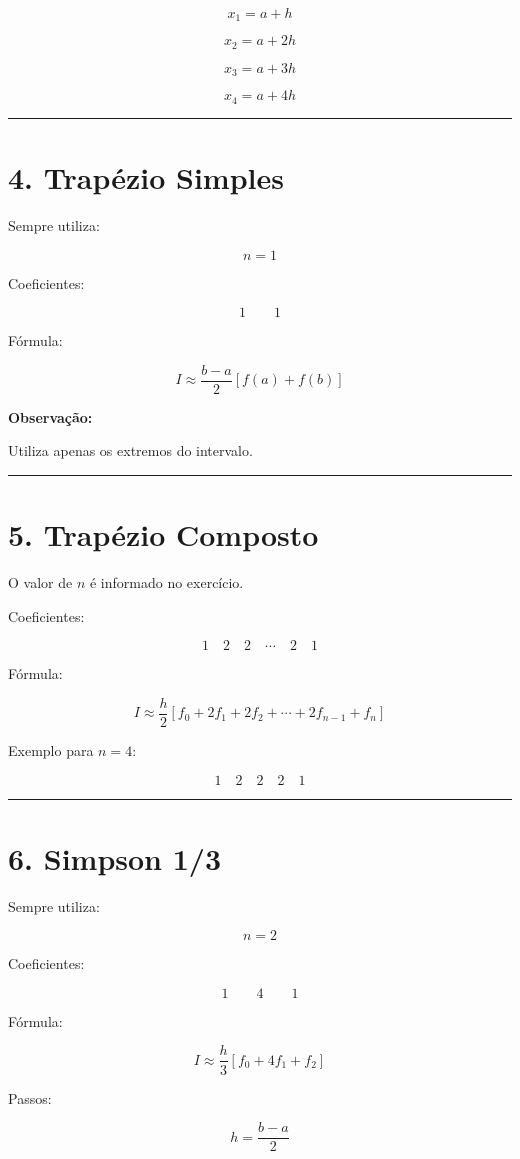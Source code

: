 \documentclass[12pt,a4paper]{article}
\begin{document}
\[
x_1=a+h
\]

\[
x_2=a+2h
\]

\[
x_3=a+3h
\]

\[
x_4=a+4h
\]

\hrule

\section*{4. Trapézio Simples}

Sempre utiliza:

\[
n=1
\]

Coeficientes:

\[
1 \qquad 1
\]

Fórmula:

\[
I
\approx
\frac{b-a}{2}
\left[f(a)+f(b)\right]
\]

\textbf{Observação:}

Utiliza apenas os extremos do intervalo.

\hrule

\section*{5. Trapézio Composto}

O valor de \(n\) é informado no exercício.

Coeficientes:

\[
1 \quad 2 \quad 2 \quad \cdots \quad 2 \quad 1
\]

Fórmula:

\[
I
\approx
\frac{h}{2}
\left[
f_0
+
2f_1
+
2f_2
+
\cdots
+
2f_{n-1}
+
f_n
\right]
\]

Exemplo para \(n=4\):

\[
1 \quad 2 \quad 2 \quad 2 \quad 1
\]

\hrule

\section*{6. Simpson 1/3}

Sempre utiliza:

\[
n=2
\]

Coeficientes:

\[
1 \qquad 4 \qquad 1
\]

Fórmula:

\[
I
\approx
\frac{h}{3}
\left[
f_0+4f_1+f_2
\right]
\]

Passos:

\[
h=\frac{b-a}{2}
\]
\end{document}
